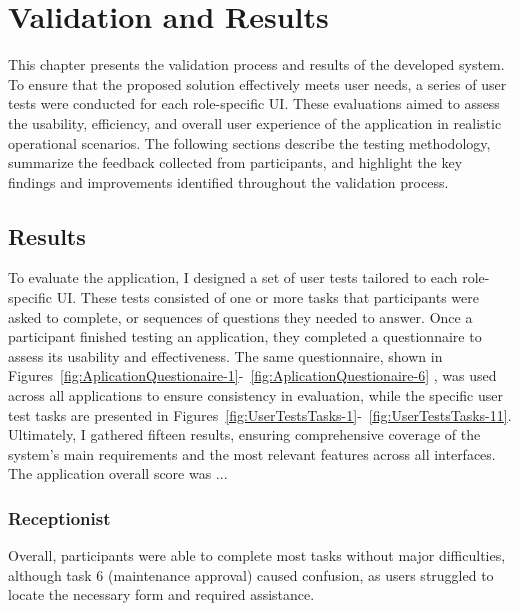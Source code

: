 \chapter{Validation and Results}%
\label{chapter:ValidationandResults}

\begin{introduction}
This chapter presents the validation process and results of the developed system. To ensure that the proposed solution effectively meets user needs, a series of user tests were conducted for each role-specific \ac{UI}. These evaluations aimed to assess the usability, efficiency, and overall user experience of the application in realistic operational scenarios.
The following sections describe the testing methodology, summarize the feedback collected from participants, and highlight the key findings and improvements identified throughout the validation process.
\end{introduction} 


\section{Results}


To evaluate the application, I designed a set of user tests tailored to each role-specific \ac{UI}. These tests consisted of one or more tasks that participants were asked to complete, or sequences of questions they needed to answer. Once a participant finished testing an application, they completed a questionnaire to assess its usability and effectiveness. The same questionnaire, shown in Figures~\ref{fig:AplicationQuestionaire-1}-~\ref{fig:AplicationQuestionaire-6} \cite{Laubheimer_2025}, was used across all applications to ensure consistency in evaluation, while the specific user test tasks are presented in Figures~\ref{fig:UserTestsTasks-1}-~\ref{fig:UserTestsTasks-11}. Ultimately, I gathered fifteen results, ensuring comprehensive coverage of the system's main requirements and the most relevant features across all interfaces. The application overall score was ... \cite{T_2021}

\subsection{Receptionist}
Overall, participants were able to complete most tasks without major difficulties, although task 6 (maintenance approval) caused confusion, as users struggled to locate the necessary form and required assistance.

